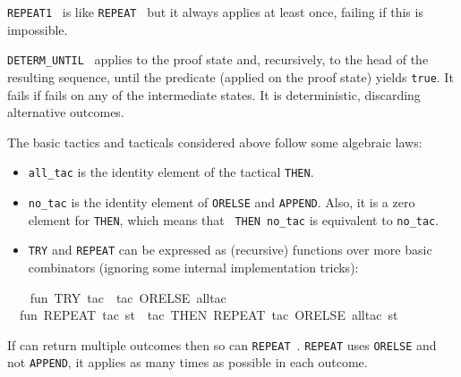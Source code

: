 \begin{isabellebody}
\begin{isamarkuptext}
\begin{description}
  \item \verb|REPEAT1|~ is like \verb|REPEAT|~
  but it always applies  at least once, failing if this
  is impossible.

  \item \verb|DETERM_UNTIL|~ applies  to
  the proof state and, recursively, to the head of the resulting
  sequence, until the predicate  (applied on the proof
  state) yields \verb|true|. It fails if  fails on any of
  the intermediate states. It is deterministic, discarding alternative
  outcomes.

  \end{description}%
\end{isamarkuptext}%
\isamarkuptrue%
%
\endisatagmlref
{\isafoldmlref}%
%
\isadelimmlref
%
\endisadelimmlref
%
\isadelimmlex
%
\endisadelimmlex
%
\isatagmlex
%
\begin{isamarkuptext}%
The basic tactics and tacticals considered above follow
  some algebraic laws:

  \begin{itemize}

  \item \verb|all_tac| is the identity element of the tactical \verb|THEN|.

  \item \verb|no_tac| is the identity element of \verb|ORELSE| and
  \verb|APPEND|.  Also, it is a zero element for \verb|THEN|,
  which means that ~\verb|THEN|~\verb|no_tac| is
  equivalent to \verb|no_tac|.

  \item \verb|TRY| and \verb|REPEAT| can be expressed as (recursive)
  functions over more basic combinators (ignoring some internal
  implementation tricks):

  \end{itemize}%
\end{isamarkuptext}%
\isamarkuptrue%
%
\endisatagmlex
{\isafoldmlex}%
%
\isadelimmlex
%
\endisadelimmlex
%
\isadelimML
%
\endisadelimML
%
\isatagML
{}\isamarkupfalse%
\ {}\isanewline
\ \ fun\ TRY\ tac\ {}\ tac\ ORELSE\ all{}tac{}\isanewline
\ \ fun\ REPEAT\ tac\ st\ {}\ {}{}tac\ THEN\ REPEAT\ tac{}\ ORELSE\ all{}tac{}\ st{}\isanewline
{}%
\endisatagML
{\isafoldML}%
%
\isadelimML
%
\endisadelimML
%
\begin{isamarkuptext}%
If  can return multiple outcomes then so can \verb|REPEAT|~.  \verb|REPEAT| uses \verb|ORELSE| and not
  \verb|APPEND|, it applies  as many times as
  possible in each outcome.


\end{isamarkuptext}
\end{isabellebody}
